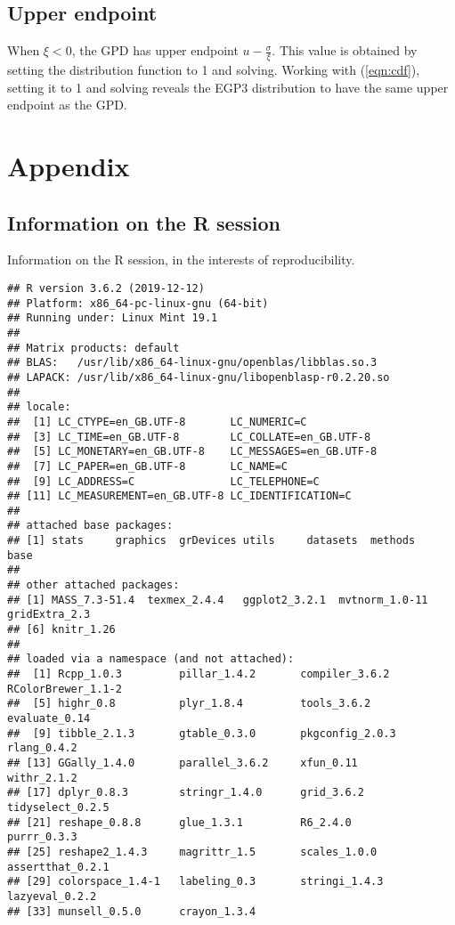 \documentclass[a4paper]{article}\usepackage[]{graphicx}\usepackage[]{color}
\makeatletter
\newenvironment{kframe}{%
 \def\at@end@of@kframe{}%
 \ifinner\ifhmode%
  \def\at@end@of@kframe{\end{minipage}}%
  \begin{minipage}{\columnwidth}%
 \fi\fi%
 \def\FrameCommand##1{\hskip\@totalleftmargin \hskip-\fboxsep
 \colorbox{shadecolor}{##1}\hskip-\fboxsep
     \hskip-\linewidth \hskip-\@totalleftmargin \hskip\columnwidth}%
 \MakeFramed {\advance\hsize-\width
   \@totalleftmargin\z@ \linewidth\hsize
   \@setminipage}}%
 {\par\unskip\endMakeFramed%
 \at@end@of@kframe}
\newenvironment{knitrout}{}{} %
\makeatother
\begin{document}
\subsection{Upper endpoint}
When $\xi < 0$, the GPD has upper endpoint $u - \frac{\sigma}{\xi}$. This value
is obtained by setting the distribution function to 1 and solving. Working with
(\ref{eqn:cdf}), setting it to 1 and solving reveals the EGP3 distribution to have
the same upper endpoint as the GPD.


\clearpage
\section{Appendix}
\subsection{Information on the R session}
Information on the R session, in the interests of reproducibility.
\begin{knitrout}
\color{fgcolor}\begin{kframe}
\begin{verbatim}
## R version 3.6.2 (2019-12-12)
## Platform: x86_64-pc-linux-gnu (64-bit)
## Running under: Linux Mint 19.1
## 
## Matrix products: default
## BLAS:   /usr/lib/x86_64-linux-gnu/openblas/libblas.so.3
## LAPACK: /usr/lib/x86_64-linux-gnu/libopenblasp-r0.2.20.so
## 
## locale:
##  [1] LC_CTYPE=en_GB.UTF-8       LC_NUMERIC=C              
##  [3] LC_TIME=en_GB.UTF-8        LC_COLLATE=en_GB.UTF-8    
##  [5] LC_MONETARY=en_GB.UTF-8    LC_MESSAGES=en_GB.UTF-8   
##  [7] LC_PAPER=en_GB.UTF-8       LC_NAME=C                 
##  [9] LC_ADDRESS=C               LC_TELEPHONE=C            
## [11] LC_MEASUREMENT=en_GB.UTF-8 LC_IDENTIFICATION=C       
## 
## attached base packages:
## [1] stats     graphics  grDevices utils     datasets  methods   base     
## 
## other attached packages:
## [1] MASS_7.3-51.4  texmex_2.4.4   ggplot2_3.2.1  mvtnorm_1.0-11 gridExtra_2.3 
## [6] knitr_1.26    
## 
## loaded via a namespace (and not attached):
##  [1] Rcpp_1.0.3         pillar_1.4.2       compiler_3.6.2     RColorBrewer_1.1-2
##  [5] highr_0.8          plyr_1.8.4         tools_3.6.2        evaluate_0.14     
##  [9] tibble_2.1.3       gtable_0.3.0       pkgconfig_2.0.3    rlang_0.4.2       
## [13] GGally_1.4.0       parallel_3.6.2     xfun_0.11          withr_2.1.2       
## [17] dplyr_0.8.3        stringr_1.4.0      grid_3.6.2         tidyselect_0.2.5  
## [21] reshape_0.8.8      glue_1.3.1         R6_2.4.0           purrr_0.3.3       
## [25] reshape2_1.4.3     magrittr_1.5       scales_1.0.0       assertthat_0.2.1  
## [29] colorspace_1.4-1   labeling_0.3       stringi_1.4.3      lazyeval_0.2.2    
## [33] munsell_0.5.0      crayon_1.3.4
\end{verbatim}
\end{kframe}
\end{knitrout}



\end{document}
